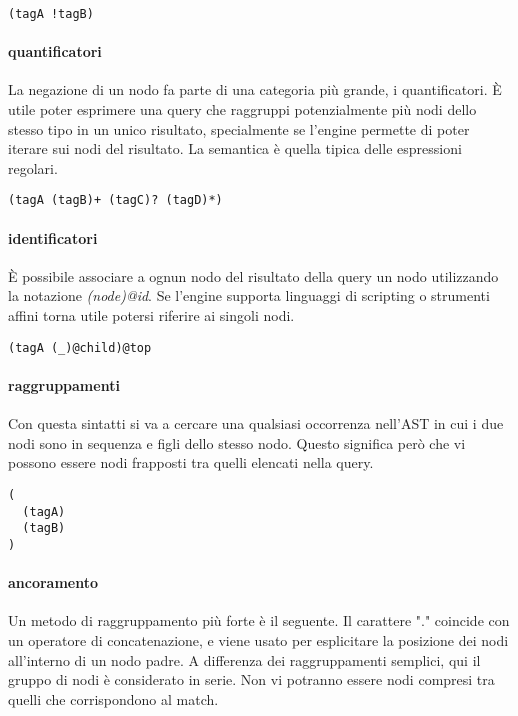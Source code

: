 \begin{lstlisting}
(tagA !tagB)
\end{lstlisting}

\paragraph{quantificatori}

La negazione di un nodo fa parte di una categoria pi\`u grande, i quantificatori.
\`E utile poter esprimere una query che raggruppi potenzialmente pi\`u nodi dello stesso tipo in un unico risultato, specialmente se l'engine permette di poter iterare sui nodi del risultato.
La semantica \`e quella tipica delle espressioni regolari.

\begin{lstlisting}
(tagA (tagB)+ (tagC)? (tagD)*)
\end{lstlisting}

\paragraph{identificatori}

\`E possibile associare a ognun nodo del risultato della query un nodo utilizzando la notazione \emph{(node)@id}.
Se l'engine supporta linguaggi di scripting o strumenti affini torna utile potersi riferire ai singoli nodi.

\begin{lstlisting}
(tagA (_)@child)@top
\end{lstlisting}

\paragraph{raggruppamenti}

Con questa sintatti si va a cercare una qualsiasi occorrenza nell'AST in cui i due nodi sono in sequenza e figli dello stesso nodo.
Questo significa per\`o che vi possono essere nodi frapposti tra quelli elencati nella query.

\begin{lstlisting}
(
  (tagA)
  (tagB)
)
\end{lstlisting}

\paragraph{ancoramento}

Un metodo di raggruppamento pi\`u forte \`e il seguente.
Il carattere "." coincide con un operatore di concatenazione, e viene usato per esplicitare la posizione dei nodi all'interno di un nodo padre.
A differenza dei raggruppamenti semplici, qui il gruppo di nodi \`e considerato in serie.
Non vi potranno essere nodi compresi tra quelli che corrispondono al match.

